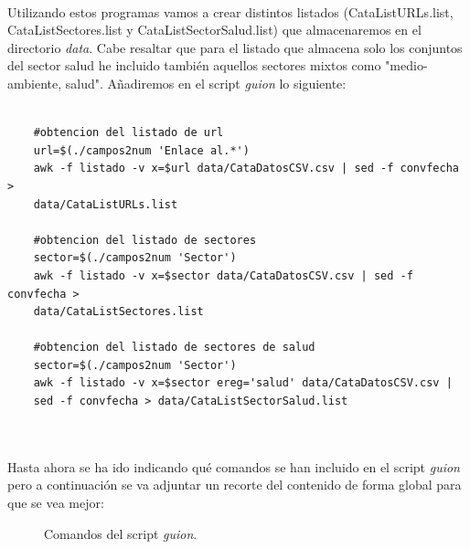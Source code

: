 \documentclass[10pt, a4paper,spanish]{article}
\begin{document}
\noindent \\ Utilizando estos programas vamos a crear distintos listados (CataListURLs.list, CataListSectores.list y CataListSectorSalud.list) que almacenaremos en el directorio \textit{data}. Cabe resaltar que para el listado que almacena solo los conjuntos del sector salud he incluido también aquellos sectores mixtos como "medio-ambiente, salud". Añadiremos en el script \textit{guion} lo siguiente:

\begin{lstlisting}
    
    #obtencion del listado de url
    url=$(./campos2num 'Enlace al.*')
    awk -f listado -v x=$url data/CataDatosCSV.csv | sed -f convfecha > 
    data/CataListURLs.list
    
    #obtencion del listado de sectores
    sector=$(./campos2num 'Sector')
    awk -f listado -v x=$sector data/CataDatosCSV.csv | sed -f convfecha > 
    data/CataListSectores.list
    
    #obtencion del listado de sectores de salud
    sector=$(./campos2num 'Sector')
    awk -f listado -v x=$sector ereg='salud' data/CataDatosCSV.csv | 
    sed -f convfecha > data/CataListSectorSalud.list
    
\end{lstlisting}

\noindent \\ Hasta ahora se ha ido indicando qué comandos se han incluido en el script \textit{guion} pero a continuación se va adjuntar un recorte del contenido de forma global para que se vea mejor:

\begin{figure}[H]
  \centering
  \caption{Comandos del script \textit{guion}.}
\end{figure}
\end{document}
